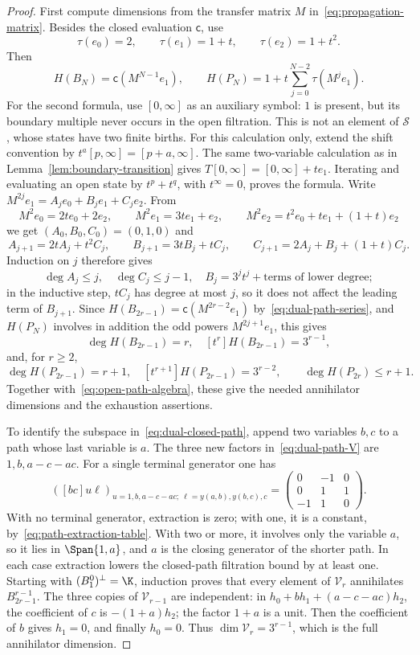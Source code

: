 \begin{proof}
First compute dimensions from the transfer matrix
$M$ in~\eqref{eq:propagation-matrix}. Besides the closed evaluation
$\mathsf c$, use
\[
\tau(e_0)=2,\qquad \tau(e_1)=1+t,\qquad \tau(e_2)=1+t^2.
\]
Then
\begin{equation}\label{eq:dual-path-series}
H(B_N)=\mathsf c(M^{N-1}e_1),\qquad
H(P_N)=1+t\sum_{j=0}^{N-2}\tau(M^je_1).
\end{equation}
For the second formula, use $[0,\infty]$ as an auxiliary symbol:
$1$ is present, but its boundary multiple never occurs in the open
filtration. This is not an element of $\mathcal S$, whose states have
two finite births. For this calculation only, extend the shift convention
by $t^a[p,\infty]=[p+a,\infty]$.
The same two-variable calculation as in
Lemma~\ref{lem:boundary-transition} gives
$T[0,\infty]=[0,\infty]+te_1$.
Iterating and evaluating an open state by $t^p+t^q$, with
$t^\infty=0$, proves the formula.
Write $M^{2j}e_1=A_je_0+B_je_1+C_je_2$. From
\[
M^2e_0=2te_0+2e_2,\qquad M^2e_1=3te_1+e_2,\qquad
M^2e_2=t^2e_0+te_1+(1+t)e_2
\]
we get $(A_0,B_0,C_0)=(0,1,0)$ and
\[
A_{j+1}=2tA_j+t^2C_j,\qquad
B_{j+1}=3tB_j+tC_j,\qquad
C_{j+1}=2A_j+B_j+(1+t)C_j.
\]
Induction on $j$ therefore gives
\[
\deg A_j\le j,\quad \deg C_j\le j-1,\quad
B_j=3^jt^j+\text{terms of lower degree};
\]
in the inductive step, $tC_j$ has degree at most $j$, so it does not
affect the leading term of $B_{j+1}$.
Since $H(B_{2r-1})=\mathsf c(M^{2r-2}e_1)$ by~\eqref{eq:dual-path-series},
and $H(P_N)$ involves in addition the odd powers $M^{2j+1}e_1$, this gives
\[
\deg H(B_{2r-1})=r,\quad [t^r]H(B_{2r-1})=3^{r-1},
\]
and, for $r\ge2$,
\[
\deg H(P_{2r-1})=r+1,\quad
[t^{r+1}]H(P_{2r-1})=3^{r-2},\qquad
\deg H(P_{2r})\le r+1.
\]
Together with~\eqref{eq:open-path-algebra}, these give the needed
annihilator dimensions and the exhaustion assertions.

To identify the subspace in~\eqref{eq:dual-closed-path}, append two
variables $b,c$ to a path whose last variable is $a$.
The three new factors in~\eqref{eq:dual-path-V} are
$1,b,a-c-ac$. For a single terminal generator one has
\begin{equation}\label{eq:path-extraction-table}
\left([bc]u\ell\right)_{
 u=1,b,a-c-ac;\ \ell=y(a,b),y(b,c),c}
 =\begin{pmatrix}0&-1&0\\0&1&1\\-1&1&0\end{pmatrix}.
\end{equation}
With no terminal generator, extraction is zero; with one, it is a
constant, by~\eqref{eq:path-extraction-table}. With two or more, it
involves only the variable $a$, so it lies in $\Span\{1,a\}$, and $a$ is
the closing generator of the shorter path. In each case extraction lowers
the closed-path filtration bound by at least one. Starting with
$(B_1^0)^\perp=\K$, induction proves that every element of $\mathcal V_r$
annihilates $B_{2r-1}^{r-1}$.
The three copies of $\mathcal V_{r-1}$ are independent: in
$h_0+bh_1+(a-c-ac)h_2$, the coefficient of $c$ is $-(1+a)h_2$;
the factor $1+a$ is a unit. Then the coefficient of $b$ gives $h_1=0$,
and finally $h_0=0$. Thus $\dim\mathcal V_r=3^{r-1}$, which is the
full annihilator dimension.


\end{proof}

